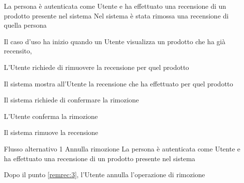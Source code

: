 {}
{La persona è autenticata come Utente e ha effettuato una recensione di un prodotto presente nel sistema}
{Nel sistema è stata rimossa una recensione di quella persona}
{\begin{enumCU}
	\item Il caso d'uso ha inizio quando un Utente visualizza un prodotto che ha già recensito, 
	\item L'Utente richiede di rimuovere la recensione per quel prodotto
	\item Il sistema mostra all'Utente la recensione che ha effettuato per quel prodotto
	\item Il sistema richiede di confermare la rimozione \label{remrec:3}
	\item L'Utente conferma la rimozione
	\item Il sistema rimuove la recensione
\end{enumCU}}
%
{Flusso alternativo 1}%
{Annulla rimozione}%
{La persona è autenticata come Utente e ha effettuato una recensione di un prodotto presente nel sistema}
{\postNulle}%
{\begin{enumCU}
		\item Dopo il punto \ref{remrec:3}, l'Utente annulla l'operazione di rimozione
	\end{enumCU}}%


